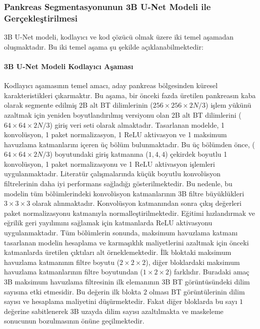 \subsubsection{Pankreas Segmentasyonunun 3B U-Net Modeli ile Gerçekleştirilmesi}
3B U-Net modeli, kodlayıcı ve kod çözücü olmak üzere iki temel aşamadan oluşmaktadır. Bu iki temel aşama şu şekilde açıklanabilmektedir:

\paragraph{3B U-Net Modeli Kodlayıcı Aşaması}
Kodlayıcı aşamasının temel amacı, aday pankreas bölgesinden küresel karakteristikleri çıkarmaktır. Bu aşama, bir önceki fazda üretilen pankreasın kaba olarak segmente edilmiş 2B alt BT dilimlerinin ($256 \times 256 \times 2N / 3$) işlem yükünü azaltmak için yeniden boyutlandırılmış versiyonu olan 2B alt BT dilimlerini ($64 \times 64 \times 2N / 3$) giriş veri seti olarak almaktadır. Tasarlanan modelde, 1 konvolüsyon, 1 paket normalizasyon, 1 ReLU aktivasyon ve 1 maksimum havuzlama katmanlarını içeren üç bölüm bulunmaktadır. Bu üç bölümden önce, ($64 \times 64 \times 2N / 3$) boyutundaki giriş katmanına ($1, 4, 4$) çekirdek boyutlu 1 konvolüsyon, 1 paket normalizasyonu ve 1 ReLU aktivasyon işlemleri uygulanmaktadır. Literatür çalışmalarında küçük boyutlu konvolüsyon filtrelerinin daha iyi performans sağladığı gösterilmektedir. Bu nedenle, bu modelin tüm bölümlerindeki konvolüsyon katmanlarının 3B filtre büyüklükleri $3 \times 3 \times 3$ olarak alınmaktadır. Konvolüsyon katmanından sonra çıkış değerleri paket normalizasyonu katmanıyla normalleştirilmektedir. Eğitimi hızlandırmak ve eğrilik geri yayılımını sağlamak için katmanlarda ReLU aktivasyonu uygulanmaktadır. Tüm bölümlerin sonunda, maksimum havuzlama katmanı tasarlanan modelin hesaplama ve karmaşıklık maliyetlerini azaltmak için önceki katmanlarda üretilen çıktıları alt örneklemektedir. İlk bloktaki maksimum havuzlama katmanının filtre boyutu ($2 \times 2 \times 2$), diğer bloklardaki maksimum havuzlama katmanlarının filtre boyutundan ($1 \times 2 \times 2$) farklıdır. Buradaki amaç 3B maksimum havuzlama filtresinin ilk elemanının 3B BT görüntüsündeki dilim sayısına etki etmesidir. Bu değerin ilk blokta $2$ olması BT görüntülerinin dilim sayısı ve hesaplama maliyetini düşürmektedir. Fakat diğer bloklarda bu sayı $1$ değerine sabitlenerek 3B uzayda dilim sayısı azaltılmakta ve maskeleme sonucunun bozulmasının önüne geçilmektedir.

